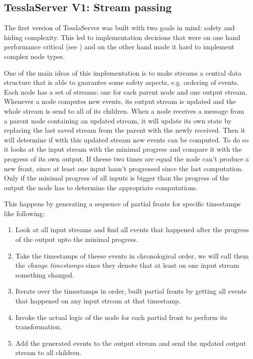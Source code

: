 \subsection{TesslaServer V1: Stream passing}
\label{sec:implementation:tesslaserver:v1}

The first version of TesslaServer was built with two goals in mind: safety and hiding complexity.
This led to implementation decisions that were on one hand performance critical (see ) and on the other hand made it hard to implement complex node types.

One of the main ideas of this implementation is to make streams a central data structure that is able to guarantee some safety aspects, e.g. ordering of events.
Each node has a set of streams: one for each parent node and one output stream.
Whenever a node computes new events, its output stream is updated and the whole stream is send to all of its children.
When a node receives a message from a parent node containing an updated stream, it will update its own state by replacing the last saved stream from the parent with the newly received.
Then it will determine if with this updated stream new events can be computed.
To do so it looks at the input stream with the minimal progress and compare it with the progress of its own output.
If theese two times are equal the node can't produce a new front, since at least one input hasn't progressed since the last computation.
Only if the minimal progress of all inputs is bigger than the progress of the output the node has to determine the appropriate computations.

This happens by generating a sequence of partial fronts for specific timestamps like following:

\begin{enumerate}
  \item Look at all input streams and find all events that happened after the progress of the output upto the minimal progress.
  \item Take the timestamps of theese events in chronological order, we will call them the \emph{change timestamps} since they denote that at least on one input stream something changed.
  \item Iterate over the timestamps in order, built partial fronts by getting all events that happened on any input stream at that timestamp.
  \item\label{sec:implementation:tesslaserver:v1:item_logic_call} Invoke the actual logic of the node for each partial front to perform its transformation.
  \item Add the generated events to the output stream and send the updated output stream to all children.
\end{enumerate}

